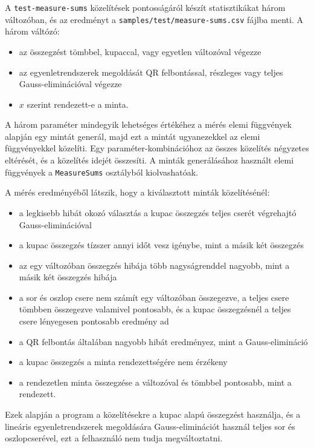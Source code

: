 A \texttt{test-measure-sums} közelítések pontosságáról készít statisztikákat három változóban, és az eredményt a \texttt{samples/test/measure-sums.csv} fájlba menti.
A három váltózó:
\begin{itemize}
\item az összegzést tömbbel, kupaccal, vagy egyetlen változóval végezze
\item az egyenletrendszerek megoldását QR felbontással, részleges vagy teljes Gauss-eliminációval végezze
\item $x$ szerint rendezett-e a minta.
\end{itemize}
A három paraméter mindegyik lehetséges értékéhez a mérés elemi függvények alapján egy mintát generál, majd ezt a mintát ugyanezekkel az elemi függvényekkel közelíti.
Egy paraméter-kombinációhoz az összes közelítés négyzetes eltérését, és a közelítés idejét összesíti.
A minták generálásához használt elemi függvények a \texttt{MeasureSums} osztályból kiolvashatóak.

A mérés eredményéből látszik, hogy a kiválasztott minták közelítésénél:
\begin{itemize}
\item a legkisebb hibát okozó választás a kupac összegzés teljes cserét végrehajtó Gauss-eliminációval
\item a kupac összegzés tízszer annyi időt vesz igénybe, mint a másik két összegzés
\item az egy változóban összegzés hibája több nagyságrenddel nagyobb, mint a másik két összegzés hibája
\item a sor és oszlop csere nem számít egy változóban összegezve, a teljes csere tömbben összegezve valamivel pontosabb, és a kupac összegzésnél a teljes csere lényegesen pontosabb eredmény ad
\item a QR felbontás általában nagyobb hibát eredményez, mint a Gauss-elimináció
\item a kupac összegzés a minta rendezettségére nem érzékeny
\item a rendezetlen minta összegzése a változóval és tömbbel pontosabb, mint a rendezett.
\end{itemize}
Ezek alapján a program a közelítésekre a kupac alapú összegzést használja, és a lineáris egyenletrendszerek megoldására Gauss-eliminációt használ teljes sor és oszlopcserével, ezt a felhasználó nem tudja megváltoztatni.

